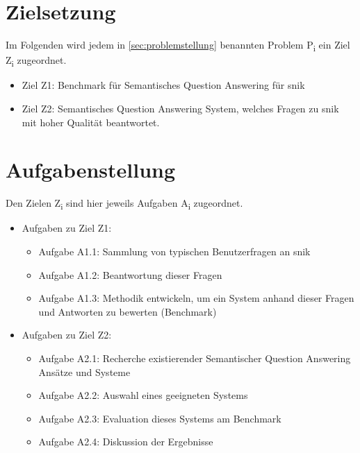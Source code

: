 \section{Zielsetzung}\label{sec:zielsetzung}

Im Folgenden wird jedem in \cref{sec:problemstellung} benannten Problem P\textsubscript{i} ein Ziel Z\textsubscript{i} zugeordnet.

	\begin{itemize}
		\item Ziel Z1: Benchmark für Semantisches Question Answering für \acs{snik}
		\item Ziel Z2: Semantisches Question Answering System, welches Fragen zu \acs{snik} mit hoher Qualität beantwortet.
	\end{itemize}
\section{Aufgabenstellung}

Den Zielen Z\textsubscript{i} sind hier jeweils Aufgaben A\textsubscript{i} zugeordnet.

\begin{itemize}

	\item Aufgaben zu Ziel Z1:
	\begin{itemize}
		\item Aufgabe A1.1: Sammlung von typischen Benutzerfragen an \acs{snik}
		\item Aufgabe A1.2: Beantwortung dieser Fragen
		\item Aufgabe A1.3: Methodik entwickeln, um ein System anhand dieser Fragen und Antworten zu bewerten (Benchmark)
	\end{itemize}
	\item Aufgaben zu Ziel Z2:
	\begin{itemize}
		\item Aufgabe A2.1: Recherche existierender Semantischer Question Answering Ansätze und Systeme
		\item Aufgabe A2.2: Auswahl eines geeigneten Systems
		\item Aufgabe A2.3: Evaluation dieses Systems am Benchmark
		\item Aufgabe A2.4: Diskussion der Ergebnisse
	\end{itemize}
\end{itemize}

